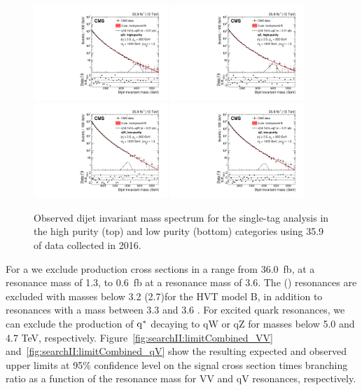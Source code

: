 \begin{figure}[h!]
\centering
\includegraphics[width=0.45\textwidth]{figures/analysis/search2/B2G-17-001/Figure_005-a.pdf}
\includegraphics[width=0.45\textwidth]{figures/analysis/search2/B2G-17-001/Figure_005-c.pdf}\\
\includegraphics[width=0.45\textwidth]{figures/analysis/search2/B2G-17-001/Figure_005-b.pdf}
\includegraphics[width=0.45\textwidth]{figures/analysis/search2/B2G-17-001/Figure_005-d.pdf}
\caption{Observed dijet invariant mass spectrum for the single-tag analysis in the high purity (top) and low purity (bottom) categories using 35.9 \fbinv of data collected in 2016.}
\label{fig:searchII:doubleobsmqv_full}
\end{figure}
\noindent For a \BulkG we exclude production cross sections in a range from 36.0~fb, at a resonance mass of 1.3\TeV, to 0.6~fb at a resonance mass of 3.6\TeV. The \PWpr (\PZpr) resonances are excluded with masses below 3.2 (2.7)\TeV for the HVT model B, in addition to \PWpr resonances with a mass between 3.3 and 3.6 \TeV. For excited quark resonances, we can exclude the production of $\rm{q}^*$ decaying to qW or qZ for masses below 5.0 and 4.7 TeV, respectively. Figure~\ref{fig:searchII:limitCombined_VV} and~\ref{fig:searchII:limitCombined_qV} show the resulting expected and observed upper limits at 95\% confidence level on the signal cross section times branching ratio as a function of the resonance mass for VV and qV resonances, respectively.
